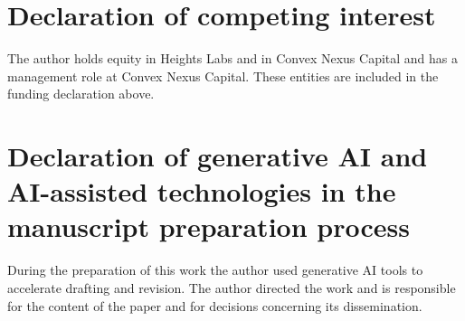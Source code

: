 \documentclass[11pt]{article}
\numberwithin{equation}{section}
\theoremstyle{definition}
\theoremstyle{remark}
\begin{document}
\section*{Declaration of competing interest}
The author holds equity in Heights Labs and in Convex Nexus Capital and has a management role at Convex Nexus Capital. These entities are included in the funding declaration above.

\section*{Declaration of generative AI and AI-assisted technologies in the manuscript preparation process}
During the preparation of this work the author used generative AI tools to accelerate drafting
and revision. The author directed the work and is responsible for the content of the paper and for decisions concerning its dissemination.

\FloatBarrier
\end{document}
